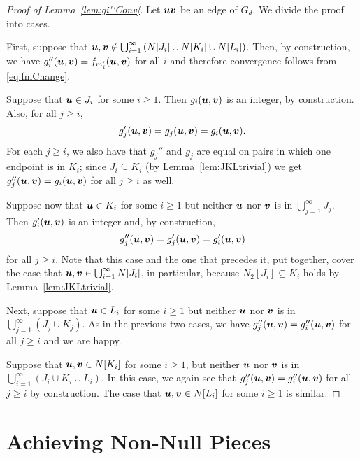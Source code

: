 \documentclass[12pt,a4paper]{amsart}
\numberwithin{equation}{section}
\theoremstyle{definition}
\begin{document}
\begin{proof}[Proof of Lemma~\ref{lem:gi''Conv}]
Let $\boldsymbol{u}\boldsymbol{v}$ be an edge of $G_d$. We divide the proof into cases.

First, suppose that $\boldsymbol{u},\boldsymbol{v}\notin\bigcup_{i=1}^\infty \left(N[J_i]\cup N[K_i]\cup N[L_i]\right)$. Then, by construction, we have $g_i''(\boldsymbol{u},\boldsymbol{v})=f_{m_i'}(\boldsymbol{u},\boldsymbol{v})$ for all $i$ and therefore convergence follows from \eqref{eq:fmChange}. 

Suppose that $\boldsymbol{u}\in J_i$ for some $i\geq1$. Then $g_i(\boldsymbol{u},\boldsymbol{v})$ is an integer, by construction. Also, for all $j\geq i$, 
\[g_j'(\boldsymbol{u},\boldsymbol{v})= g_j(\boldsymbol{u},\boldsymbol{v})=g_i(\boldsymbol{u},\boldsymbol{v}).\]   
For each $j\geq i$, we also have that $g_j''$ and $g_j$ are equal on pairs in which one endpoint is in $K_i$; since $J_i\subseteq K_i$ (by Lemma~\ref{lem:JKLtrivial}) we get $g_j''(\boldsymbol{u},\boldsymbol{v})=g_i(\boldsymbol{u},\boldsymbol{v})$ for all $j\geq i$ as well.

Suppose now that $\boldsymbol{u}\in K_i$ for some $i\geq1$ but neither $\boldsymbol{u}$ nor $\boldsymbol{v}$ is in $\bigcup_{j=1}^\infty J_j$. Then $g_i'(\boldsymbol{u},\boldsymbol{v})$ is an integer and, by construction, 
\[g_j''(\boldsymbol{u},\boldsymbol{v})=g_j'(\boldsymbol{u},\boldsymbol{v})=g_i'(\boldsymbol{u},\boldsymbol{v})\]
for all $j\geq i$. Note that this case and the one that precedes it, put together, cover the case that $\boldsymbol{u},\boldsymbol{v}\in \bigcup_{i=1}^\infty N[J_i]$, in particular, because $N_2[J_i]\subseteq K_i$ holds by Lemma~\ref{lem:JKLtrivial}.

Next, suppose that $\boldsymbol{u}\in L_i$ for some $i\geq1$ but neither $\boldsymbol{u}$ nor $\boldsymbol{v}$ is in $\bigcup_{j=1}^\infty \left(J_j\cup K_j\right)$. As in the previous two cases, we have $g_j''(\boldsymbol{u},\boldsymbol{v})= g_i''(\boldsymbol{u},\boldsymbol{v})$ for all $j\geq i$ and we are happy.

Suppose that $\boldsymbol{u},\boldsymbol{v}\in N[K_i]$ for some $i\geq1$, but neither $\boldsymbol{u}$ nor $\boldsymbol{v}$ is in $\bigcup_{i=1}^\infty \left(J_i\cup K_i\cup L_i\right)$. In this case, we again see that $g_j''(\boldsymbol{u},\boldsymbol{v})=g_i''(\boldsymbol{u},\boldsymbol{v})$ for all $j\geq i$ by construction. The case that $\boldsymbol{u},\boldsymbol{v}\in N[L_i]$ for some $i\geq1$ is similar. 
\end{proof}


\section{Achieving Non-Null Pieces}
\label{sec:nonNull}
\end{document}
